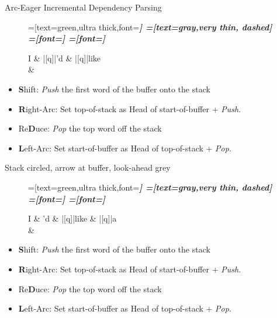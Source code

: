 \documentclass{lecture}
\begin{document}
\begin{plain}{Arc-Eager Incremental Dependency Parsing}
\begin{figure}
    \centering
    \begin{dependency}[theme=simple]
    =[text=green,ultra thick,font=\bfseries\itshape]
    =[text=gray,very thin, dashed]
    =[font=\bfseries\itshape]
    =[font=\itshape]
    \begin{deptext}[column sep=.075cm, row sep=.1ex]
        I \& |[q]|'d \& |[q]|like \\
         \& \\
    \end{deptext}
\end{dependency}
\end{figure}
    \begin{itemize}
        \item \textbf{S}hift: \emph{Push} the first word of the buffer onto the stack
    \item \textbf{R}ight-Arc: Set top-of-stack as Head of start-of-buffer + \emph{Push}.
    \item Re\textbf{D}uce: \emph{Pop} the top word off the stack
    \item \textbf{L}eft-Arc: Set start-of-buffer as Head of top-of-stack + \emph{Pop}.
    \end{itemize}
\end{plain}


\begin{plain}{Stack circled, arrow at buffer, look-ahead grey}
\begin{figure}
    \centering
    \begin{dependency}[theme=simple]
    =[text=green,ultra thick,font=\bfseries\itshape]
    =[text=gray,very thin, dashed]
    =[font=\bfseries\itshape]
    =[font=\itshape]
    \begin{deptext}[column sep=.075cm, row sep=.1ex]
        I \& 'd \& |[q]|like \& |[q]|a \\
        \& \\
    \end{deptext}
\end{dependency}
\end{figure}
    \begin{itemize}
        \item \textbf{S}hift: \emph{Push} the first word of the buffer onto the stack
    \item \textbf{R}ight-Arc: Set top-of-stack as Head of start-of-buffer + \emph{Push}.
    \item Re\textbf{D}uce: \emph{Pop} the top word off the stack
    \item \textbf{L}eft-Arc: Set start-of-buffer as Head of top-of-stack + \emph{Pop}.
    \end{itemize}
\end{plain}
\end{document}
